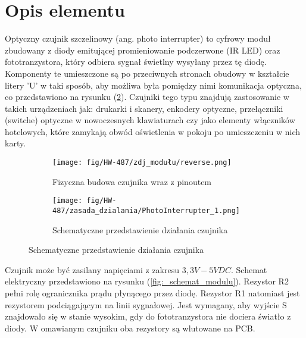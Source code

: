 \documentclass[11pt, a4paper]{article}
\author{Jakub Grzesiak}
\begin{document}
%
%
\newpage

\section*{Opis elementu}
Optyczny czujnik szczelinowy (ang. photo interrupter) to cyfrowy moduł zbudowany z diody emitującej promieniowanie podczerwone (IR LED) oraz fototranzystora, który odbiera sygnał świetlny wysyłany przez tę diodę. Komponenty te umieszczone są po przeciwnych stronach obudowy w kształcie litery 'U' w taki sposób, aby możliwa była pomiędzy nimi komunikacja optyczna, co przedstawiono na rysunku (\ref{fig:_zasada_dzialania_elementu}). Czujniki tego typu znajdują zastosowanie w takich urządzeniach jak: drukarki i skanery, enkodery optyczne, przełączniki (switche) optyczne w nowoczesnych klawiaturach czy jako elementy włączników hotelowych, które zamykają obwód oświetlenia w pokoju po umieszczeniu w nich karty.


\vspace{0.25cm}
\begin{figure}[h]
\centering
\begin{subfigure}{.5\textwidth}
\centering
\texttt{[image: fig/HW-487/zdj\_modułu/reverse.png]}
\caption{Fizyczna budowa czujnika wraz z pinoutem}
\label{fig:_zdjecie_elementu}
\end{subfigure}%
\begin{subfigure}{.5\textwidth}
\centering
\texttt{[image: fig/HW-487/zasada\_dzialania/PhotoInterrupter\_1.png]}
\caption{Schematyczne przedstawienie działania czujnika}
\label{fig:_zasada_dzialania_elementu}
\end{subfigure}
\label{fig:element}
\end{figure}
\vspace{0.25cm}

Czujnik może być zasilany napięciami z zakresu $3,3V - 5V DC$. Schemat elektryczny przedstawiono na rysunku (\ref{fig:_schemat_modulu}). Rezystor R2 pełni rolę ogranicznika prądu płynącego przez diodę. Rezystor R1 natomiast jest rezystorem podciągającym na linii sygnałowej. Jest wymagany, aby wyjście S znajdowało się w stanie wysokim, gdy do fototranzystora nie dociera światło z diody. W omawianym czujniku oba rezystory są wlutowane na PCB.
\end{document}
